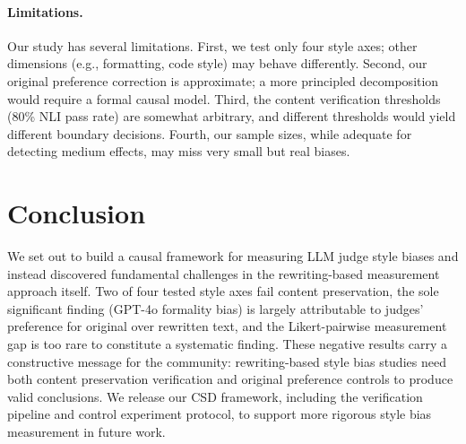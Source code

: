 \documentclass[11pt,a4paper]{article}
\begin{document}
\paragraph{Limitations.}
Our study has several limitations.
First, we test only four style axes; other dimensions (e.g., formatting, code style) may behave differently.
Second, our original preference correction is approximate; a more principled decomposition would require a formal causal model.
Third, the content verification thresholds (80\% NLI pass rate) are somewhat arbitrary, and different thresholds would yield different boundary decisions.
Fourth, our sample sizes, while adequate for detecting medium effects, may miss very small but real biases.

\section{Conclusion}

We set out to build a causal framework for measuring LLM judge style biases and instead discovered fundamental challenges in the rewriting-based measurement approach itself.
Two of four tested style axes fail content preservation, the sole significant finding (GPT-4o formality bias) is largely attributable to judges' preference for original over rewritten text, and the Likert-pairwise measurement gap is too rare to constitute a systematic finding.
These negative results carry a constructive message for the community: rewriting-based style bias studies need both content preservation verification and original preference controls to produce valid conclusions.
We release our CSD framework, including the verification pipeline and control experiment protocol, to support more rigorous style bias measurement in future work.


\end{document}
